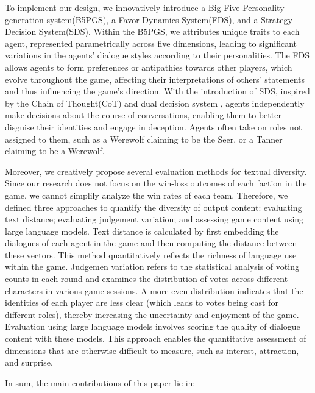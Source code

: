 \documentclass[11pt]{article}
\begin{document}
To implement our design, we innovatively introduce a Big Five Personality generation system(B5PGS), a Favor Dynamics System(FDS), and a Strategy Decision System(SDS). Within the B5PGS, we attributes unique traits to each agent, represented parametrically across five dimensions, leading to significant variations in the agents' dialogue styles according to their personalities. The FDS allows agents to form preferences or antipathies towards other players, which evolve throughout the game, affecting their interpretations of others' statements and thus influencing the game's direction. With the introduction of SDS, inspired by the Chain of Thought(CoT) \citep{wei2022chain} and dual decision system \citep{wu2024enhance}, agents independently make decisions about the course of conversations, enabling them to better disguise their identities and engage in deception. Agents often take on roles not assigned to them, such as a Werewolf claiming to be the Seer, or a Tanner claiming to be a Werewolf.



Moreover, we creatively propose several evaluation methods for textual diversity. Since our research does not focus on the win-loss outcomes of each faction in the game, we cannot simplily analyze the win rates of each team. Therefore, we defined three approaches to quantify the diversity of output content: evaluating text distance; evaluating judgement variation; and assessing game content using large language models. Text distance is calculated by first embedding the dialogues of each agent in the game \citep{mikolov2013efficient} and then computing the distance between these vectors. This method quantitatively reflects the richness of language use within the game. Judgemen variation refers to the statistical analysis of voting counts in each round and examines the distribution of votes across different characters in various game sessions. A more even distribution indicates that the identities of each player are less clear (which leads to votes being cast for different roles), thereby increasing the uncertainty and enjoyment of the game. Evaluation using large language models \citep{shao2023character,wang2024incharacter} involves scoring the quality of dialogue content with these models. This approach enables the quantitative assessment of dimensions that are otherwise difficult to measure, such as interest, attraction, and surprise.

In sum, the main contributions of this paper lie in:
\end{document}
